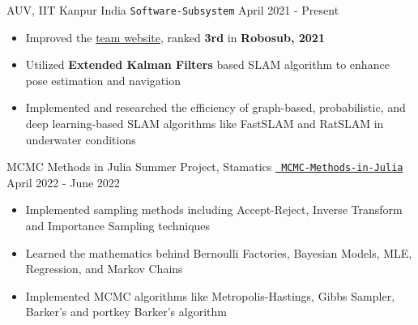 \cventry
{AUV, IIT Kanpur} %
{India} %
{\texttt{Software-Subsystem}} %
{April 2021 - Present} %
{
  \begin{itemize} %
    \item {Improved the \href{https://auv.sntiitk.in/}{team website}, ranked \textbf{3rd} in \textbf{Robosub, 2021}}
    \item Utilized \textbf{Extended Kalman Filters} based SLAM algorithm to enhance pose estimation and navigation
    \item Implemented and researched the efficiency of graph-based, probabilistic, and deep learning-based SLAM algorithms like FastSLAM and RatSLAM in underwater conditions
  \end{itemize}
}
  \cventry
  {MCMC Methods in Julia}
  {Summer Project, Stamatics}
  {\texttt{\href{https://github.com/abhishekshree/mcmc-methods-in-julia}{\faGithub{} MCMC-Methods-in-Julia}}}
  {April 2022 - June 2022}
  {
    \begin{itemize}
      \item Implemented sampling methods including Accept-Reject, Inverse Transform and Importance Sampling techniques
      \item Learned the mathematics behind Bernoulli Factories, Bayesian Models, MLE, Regression, and Markov Chains
      \item Implemented MCMC algorithms like Metropolis-Hastings, Gibbs Sampler, Barker's and portkey Barker’s algorithm
    \end{itemize}
  }
